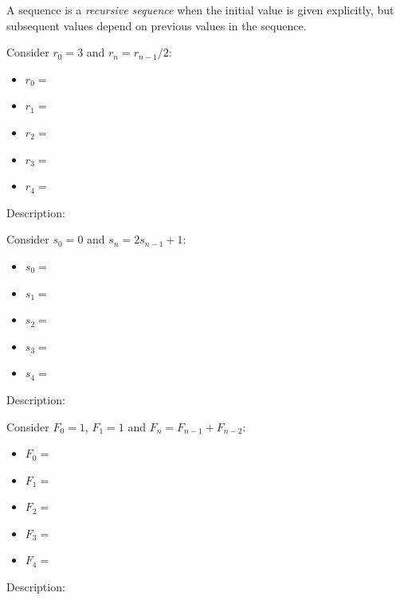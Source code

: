 \begin{defn}
    A sequence is a \emph{recursive sequence} when the initial value is given explicitly, but subsequent values depend on previous values in the sequence.
\end{defn}

\begin{practiceprob} Consider \(r_0=3\) and \(r_n=r_{n-1}/2\):
    \begin{itemize}
        \item \(r_0=\)
        \item \(r_1=\)
        \item \(r_2=\)
        \item \(r_3=\)
        \item \(r_4=\)
    \end{itemize}
    Description:
\end{practiceprob}


\begin{practiceprob} Consider \(s_0=0\) and \(s_n=2s_{n-1}+1\):
    \begin{itemize}
        \item \(s_0=\)
        \item \(s_1=\)
        \item \(s_2=\)
        \item \(s_3=\)
        \item \(s_4=\)
    \end{itemize}
    Description:
\end{practiceprob}


\begin{practiceprob} Consider \(F_0=1\), \(F_1=1\) and \(F_n=F_{n-1}+F_{n-2}\):
    \begin{itemize}
        \item \(F_0=\)
        \item \(F_1=\)
        \item \(F_2=\)
        \item \(F_3=\)
        \item \(F_4=\)
    \end{itemize}
    Description:
\end{practiceprob}


